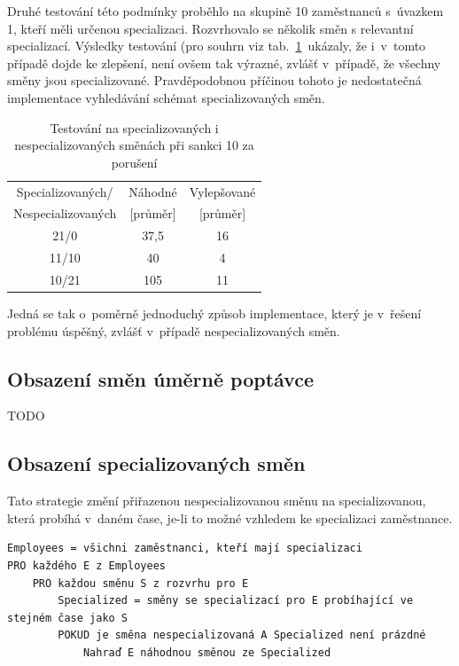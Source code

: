 \documentclass[twoside]{ctuthesis}
\begin{document}
\begin{enumerate}[label=\textbf{O\arabic*.}]
Druhé testování této podmínky proběhlo na skupině 10 zaměstnanců s~úvazkem 1, kteří měli určenou specializaci. Rozvrhovalo se několik směn s relevantní specializací. Výsledky testování (pro souhrn viz tab.~\ref{tab:noemptyspecialized} ukázaly, že i~v~tomto případě dojde ke zlepšení, není ovšem tak výrazné, zvlášť v~případě, že všechny směny jsou specializované. Pravděpodobnou příčinou tohoto je nedostatečná implementace vyhledávání schémat specializovaných směn.

\begin{table}[h!]
	\caption{Testování na specializovaných i nespecializovaných směnách při sankci 10 za porušení}
	\label{tab:noemptyspecialized}
	\begin{tabular}{|c|c|c|}
		\hline
		Specializovaných/ & Náhodné & Vylepšované \\
		Nespecializovaných & [průměr] & [průměr] \\
		\hline
		21/0 & 37,5 & 16 \\
		11/10 & 40 & 4 \\
		10/21 & 105 & 11 \\
		\hline
	\end{tabular}

\end{table}

Jedná se tak o~poměrně jednoduchý způsob implementace, který je v~řešení problému úspěšný, zvlášť v~případě nespecializovaných směn.


\subsection{Obsazení směn úměrně poptávce}

TODO

\subsection{Obsazení specializovaných směn}
Tato strategie změní přiřazenou nespecializovanou směnu na specializovanou, která probíhá v~daném čase, je-li to možné vzhledem ke specializaci zaměstnance.

\begin{lstlisting}[caption={Pseudokód pro vylepšování obsazení specializovaných směn}]
Employees = všichni zaměstnanci, kteří mají specializaci
PRO každého E z Employees
	PRO každou směnu S z rozvrhu pro E
		Specialized = směny se specializací pro E probíhající ve stejném čase jako S
		POKUD je směna nespecializovaná A Specialized není prázdné
		 	Nahraď E náhodnou směnou ze Specialized
\end{lstlisting}


\end{enumerate}
\end{document}
